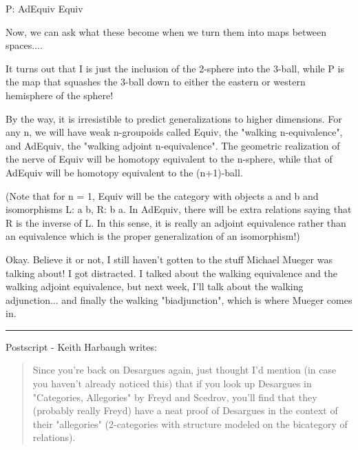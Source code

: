 P: AdEquiv \to  Equiv

Now, we can ask what these become when we turn them into maps between
spaces....

It turns out that I is just the inclusion of the 2-sphere into the
3-ball, while P is the map that squashes the 3-ball down to either the
eastern or western hemisphere of the sphere!  

By the way, it is irresistible to predict generalizations to higher
dimensions.  For any n, we will have weak n-groupoids called Equiv, the
"walking n-equivalence", and AdEquiv, the "walking adjoint
n-equivalence".  The geometric realization of the nerve of Equiv will be
homotopy equivalent to the n-sphere, while that of AdEquiv will be
homotopy equivalent to the (n+1)-ball.

(Note that for n = 1, Equiv will be the category with objects
a and b and isomorphisms L: a \to  b, R: b \to  a.   In AdEquiv, there
will be extra relations saying that R is the inverse of L.  In
this sense, it is really an adjoint equivalence rather than an
equivalence which is the proper generalization of an isomorphism!)

Okay.  Believe it or not, I still haven't gotten to the stuff Michael
Mueger was talking about!  I got distracted.   I talked about the
walking equivalence and the walking adjoint equivalence, but next week,
I'll talk about the walking adjunction... and finally the walking
"biadjunction", which is where Mueger comes in.

\par\noindent\rule{\textwidth}{0.4pt}
Postscript - Keith Harbaugh writes:
\begin{quote}
Since you're back on Desargues again, just thought I'd mention
(in case you haven't already noticed this)
that if you look up Desargues in "Categories, Allegories"
by Freyd and Scedrov,
you'll find that they (probably really Freyd)
have a neat proof of Desargues in the context of their "allegories"
(2-categories with structure modeled on the bicategory of relations).
\end{quote}

